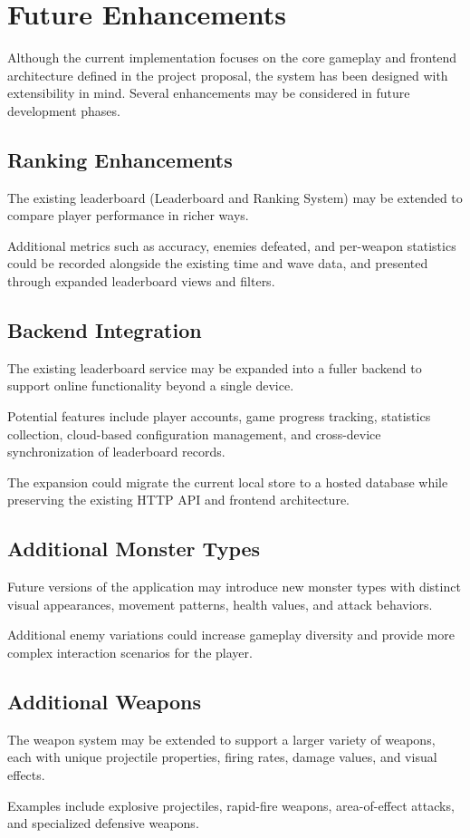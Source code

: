 \documentclass[11pt,a4paper]{article}
\begin{document}
\section{Future Enhancements}

Although the current implementation focuses on the core gameplay and frontend
architecture defined in the project proposal, the system has been designed with
extensibility in mind. Several enhancements may be considered in future
development phases.

\subsection{Ranking Enhancements}

The existing leaderboard (Leaderboard and Ranking System) may be extended to
compare player performance in richer ways.

Additional metrics such as accuracy, enemies defeated, and per-weapon statistics
could be recorded alongside the existing time and wave data, and presented
through expanded leaderboard views and filters.

\subsection{Backend Integration}

The existing leaderboard service may be expanded into a fuller backend to support
online functionality beyond a single device.

Potential features include player accounts, game progress tracking, statistics
collection, cloud-based configuration management, and cross-device
synchronization of leaderboard records.

The expansion could migrate the current local store to a hosted database while
preserving the existing HTTP API and frontend architecture.

\subsection{Additional Monster Types}

Future versions of the application may introduce new monster types with distinct
visual appearances, movement patterns, health values, and attack behaviors.

Additional enemy variations could increase gameplay diversity and provide more
complex interaction scenarios for the player.

\subsection{Additional Weapons}

The weapon system may be extended to support a larger variety of weapons, each
with unique projectile properties, firing rates, damage values, and visual
effects.

Examples include explosive projectiles, rapid-fire weapons, area-of-effect
attacks, and specialized defensive weapons.
\end{document}
